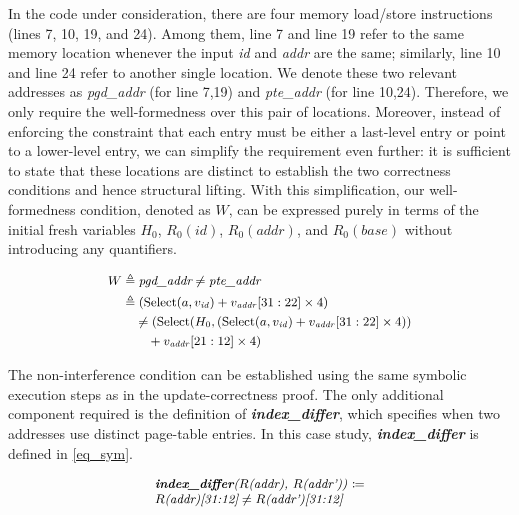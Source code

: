 In the code under consideration, there are four memory load/store instructions (lines 7, 10, 19, and 24). Among them, line 7 and line 19 refer to the same memory location whenever the input \textit{id} and \textit{addr} are the same; similarly, line 10 and line 24 refer to another single location. We denote these two relevant addresses as \textit{pgd\_addr} (for line 7,19) and \textit{pte\_addr} (for line 10,24). Therefore, we only require the well-formedness over this pair of locations. Moreover, instead of enforcing the constraint that each entry must be either a last-level entry or point to a lower-level entry, we can simplify the requirement even further: it is sufficient to state that these locations are distinct to establish the two correctness conditions and hence structural lifting. With this simplification, our well-formedness condition, denoted as $W$, can be expressed purely in terms of the initial fresh variables $H_0$, $R_0(\textit{id})$, $R_0(\textit{addr})$, and $R_0(\textit{base})$ without introducing any quantifiers.

\begin{equation}
\label{wf}
\small
\begin{aligned}
    W & \triangleq \textit{pgd\_addr} \neq \textit{pte\_addr}\\
      & \triangleq (\text{Select}(a, v_{\mathit{id}}) + v_{\mathit{addr}}[31:22] \times 4)\\
      & \quad \neq  (\text{Select}(H_0, (\text{Select}(a, v_{\mathit{id}}) + v_{\mathit{addr}}[31:22] \times 4)) \\
      & \quad \quad + v_{\mathit{addr}}[21:12] \times 4 ) 
\end{aligned}
\end{equation}

The non-interference condition can be established using the same symbolic execution steps as in the update-correctness proof. The only additional component required is the definition of \textit{\textbf{index\_differ}}, which specifies when two addresses use distinct page-table entries. In this case study, \textit{\textbf{index\_differ}} is defined in \autoref{eq_sym}.

\begin{equation} 
\small
\label{eq_sym} 
\begin{array}{l} 
\textit{\textbf{index\_differ}($R$(addr), $R$(addr')) $\coloneq$} \\ \textit{$R$(addr)[31:12]} \neq \textit{$R$(addr')[31:12]} \\ 
\end{array} 
\end{equation}





